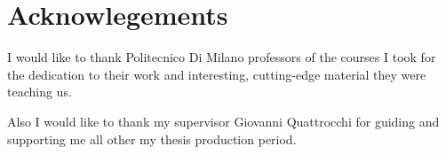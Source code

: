 \chapter*{Acknowlegements}


I would like to thank Politecnico Di Milano professors of the courses I took for the dedication to their work and interesting, cutting-edge material they were teaching us.

\vspace{0.5cm}
\noindent Also I would like to thank my supervisor Giovanni Quattrocchi for guiding and supporting me all other my thesis production period.
